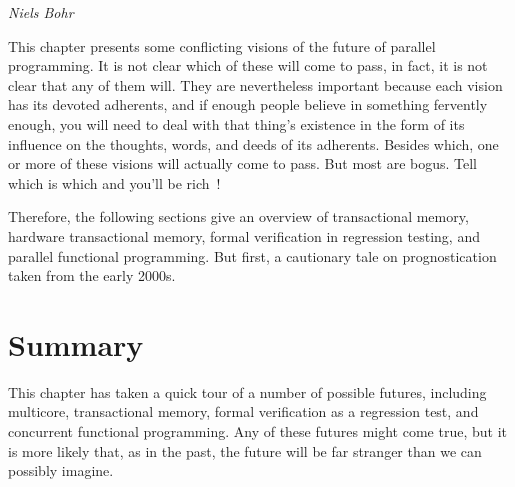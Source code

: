 
%
	 {\emph{Niels Bohr}}

This chapter presents some conflicting visions of the future of parallel
programming.
It is not clear which of these will come to pass, in fact, it is not
clear that any of them will.
They are nevertheless important because each vision has its devoted
adherents, and if enough people believe in something fervently enough,
you will need to deal with that thing's existence in the form of its
influence on the thoughts, words, and deeds of its adherents.
Besides which, one or more of these visions will actually come to pass.
But most are bogus.
Tell which is which and you'll be rich~\cite{KeithRSpitz1977}!

Therefore, the following sections give an overview of transactional
memory, hardware transactional memory,
formal verification in regression testing, and
parallel functional programming.
But first, a cautionary tale on prognostication taken from the early 2000s.


\IfTwoColumn{}{\FloatBarrier}

\IfTwoColumn{}{\FloatBarrier}




\section{Summary}
\label{sec:future:Summary}

This chapter has taken a quick tour of a number of possible futures,
including multicore, transactional memory, formal verification as
a regression test, and concurrent functional programming.
Any of these futures might come true, but it is more likely that, as in
the past, the future will be far stranger than we can possibly imagine.

